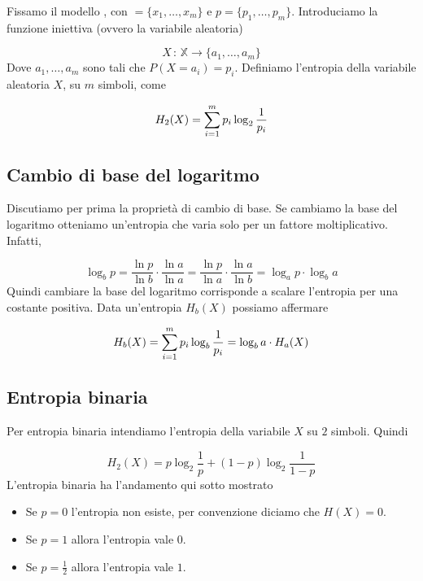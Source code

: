 \documentclass[12pt]{report}
\begin{document}
    Fissamo il modello \modello, con \sorgente$=\{x_1,\dots,x_m\}$ e $p = \{p_1,\dots,p_m\}$. Introduciamo la funzione iniettiva (ovvero la variabile aleatoria)

    $$X\,:\, \mathbb{X} \rightarrow \{a_1,\dots,a_m\}$$
    Dove $a_1,\dots,a_m$ sono tali che $P(X = a_i) = p_i$. Definiamo l'entropia della variabile aleatoria $X$, su $m$ simboli, come

    $$H_2(X) = \sum_{i=1}^{m} p_i \log_2{\frac{1}{p_i}}$$

    \subsection{Cambio di base del logaritmo}

    Discutiamo per prima la proprietà di cambio di base. Se cambiamo la base del logaritmo otteniamo un'entropia che varia solo per un fattore moltiplicativo. Infatti,

    $$\log_b{p} = \frac{\ln{p}}{\ln{b}} \cdot \frac{\ln{a}}{\ln{a}} = \frac{\ln{p}}{\ln{a}} \cdot \frac{\ln{a}}{\ln{b}} = \log_a{p} \cdot \log_b{a}$$
    Quindi cambiare la base del logaritmo corrisponde a scalare l'entropia per una costante positiva. Data un'entropia $H_b(X)$ possiamo affermare

    $$H_b(X) = \sum_{i=1}^{m} p_i \log_b{\frac{1}{p_i}} = \log_b{a} \cdot H_a(X)$$

    \subsection{Entropia binaria}

    Per entropia binaria intendiamo l'entropia della variabile $X$ su $2$ simboli. Quindi

    $$H_2(X) = p\log_2{\frac{1}{p}} + (1-p)\log_2{\frac{1}{1-p}}$$
    L'entropia binaria ha l'andamento qui sotto mostrato

    \vspace{10px}


    \noindent

    \begin{itemize}
        \item Se $p = 0$ l'entropia non esiste, per convenzione diciamo che $H(X) = 0$.
        \item Se $p = 1$ allora l'entropia vale $0$.
        \item Se $p = \frac{1}{2}$ allora l'entropia vale $1$.
    \end{itemize}
\end{document}
